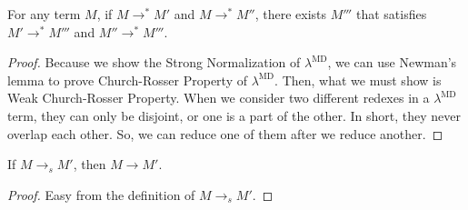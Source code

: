 %
%
%

\begin{theorem}[Confluence]
    \label{theorem:Confluence}
    For any term $M$, if $M \longrightarrow^* M'$ and $M \longrightarrow^* M''$,
    there exists $M'''$ that satisfies $M' \longrightarrow^* M'''$ and $M'' \longrightarrow^* M'''$.
\end{theorem}

\begin{proof}
    Because we show the Strong Normalization of $\lambda^{\text{MD}}$, we can
    use Newman's lemma to prove Church-Rosser Property of
    $\lambda^{\text{MD}}$.  Then, what we must show is Weak Church-Rosser
    Property. When we consider two different redexes in a
    $\lambda^{\text{MD}}$ term, they can only be disjoint, or one is a part of
    the other. In short, they never overlap each other.  So, we can reduce one
    of them after we reduce another.
\end{proof}

\begin{theorem}
    If $M \longrightarrow_s M'$, then $M \longrightarrow M'$.
\end{theorem}
\begin{proof}
    Easy from the definition of \( M \longrightarrow_s M' \).
\end{proof}

